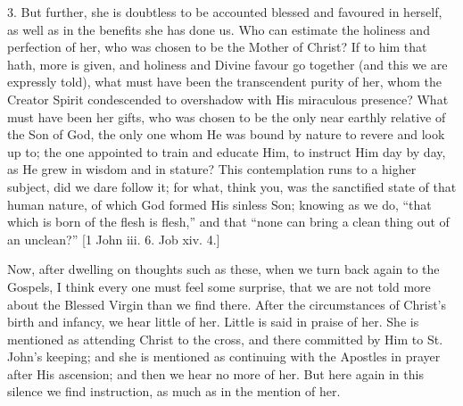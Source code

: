 3. But further, she is doubtless to be accounted blessed and favoured
in herself, as well as in the benefits she has done us. Who can estimate
the holiness and perfection of her, who was chosen to be the Mother of
Christ? If to him that hath, more is given, and holiness and Divine
favour go together (and this we are expressly told), what must have been
the transcendent purity of her, whom the Creator Spirit condescended to
overshadow with His miraculous presence? What must have been her gifts,
who was chosen to be the only near earthly relative of the Son of God,
the only one whom He was bound by nature to revere and look up to; the
one appointed to train and educate Him, to instruct Him day by day, as
He grew in wisdom and in stature? This contemplation runs to a higher
subject, did we dare follow it; for what, think you, was the sanctified
state of that human nature, of which God formed His sinless Son; knowing
as we do, ``that which is born of the flesh is flesh,'' and that
``none can bring a clean thing out of an unclean?'' [1 John iii.
6. Job xiv. 4.]

Now, after dwelling on thoughts such as these, when we turn back
again to the Gospels, I think every one must feel some surprise, that we
are not told more about the Blessed Virgin than we find there. After the
circumstances of Christ's birth and infancy, we hear little of her.
Little is said in praise of her. She is mentioned as attending Christ to
the cross, and there committed by Him to St. John's keeping; and she is
mentioned as continuing with the Apostles in prayer after His ascension;
and then we hear no more of her. But here again in this silence we find
instruction, as much as in the mention of her.

